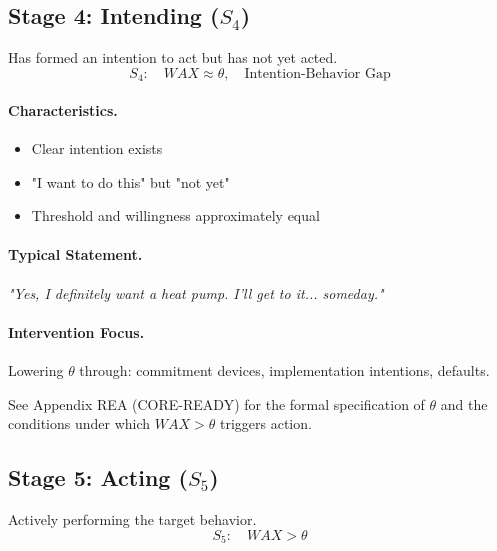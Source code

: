 \subsection{Stage 4: Intending ($S_4$)}
\label{sec:bcj-s4}

\begin{definition}
Has formed an intention to act but has not yet acted.
\begin{equation}
S_4: \quad WAX \approx \theta, \quad \text{Intention-Behavior Gap}
\end{equation}
\end{definition}

\paragraph{Characteristics.}
\begin{itemize}
    \item Clear intention exists
    \item "I want to do this" but "not yet"
    \item Threshold and willingness approximately equal
\end{itemize}

\paragraph{Typical Statement.}
\textit{"Yes, I definitely want a heat pump. I'll get to it... someday."}

\paragraph{Intervention Focus.}
Lowering $\theta$ through: commitment devices, implementation intentions, defaults.

\begin{cross-reference}
See Appendix REA (CORE-READY) for the formal specification of $\theta$
and the conditions under which $WAX > \theta$ triggers action.
\end{cross-reference}

\subsection{Stage 5: Acting ($S_5$)}
\label{sec:bcj-s5}

\begin{definition}
Actively performing the target behavior.
\begin{equation}
S_5: \quad WAX > \theta
\end{equation}
\end{definition}


